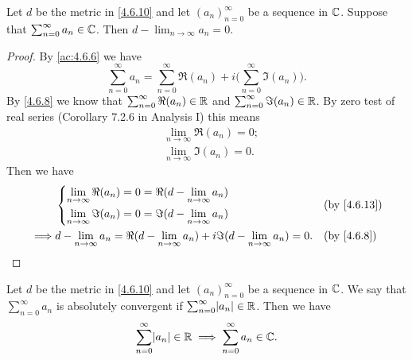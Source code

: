 \begin{ac}\label{ac:4.6.7}
  Let \(d\) be the metric in \cref{4.6.10} and let \((a_n)_{n = 0}^\infty\) be a sequence in \(\mathbb{C}\).
  Suppose that \(\sum_{n = 0}^\infty a_n \in \mathbb{C}\).
  Then \(d - \lim_{n \to \infty} a_n = 0\).
\end{ac}

\begin{proof}
  By \cref{ac:4.6.6} we have
  \[
    \sum_{n = 0}^\infty a_n = \sum_{n = 0}^\infty \Re(a_n) + i \bigg(\sum_{n = 0}^\infty \Im(a_n)\bigg).
  \]
  By \cref{4.6.8} we know that \(\sum_{n = 0}^\infty \Re(a_n) \in \mathbb{R}\) and \(\sum_{n = 0}^\infty \Im(a_n) \in \mathbb{R}\).
  By zero test of real series (Corollary 7.2.6 in Analysis I) this means
  \begin{align*}
     & \lim_{n \to \infty} \Re(a_n) = 0; \\
     & \lim_{n \to \infty} \Im(a_n) = 0.
  \end{align*}
  Then we have
  \begin{align*}
             & \begin{dcases}
                 \lim_{n \to \infty} \Re(a_n) = 0 = \Re(d - \lim_{n \to \infty} a_n) \\
                 \lim_{n \to \infty} \Im(a_n) = 0 = \Im(d - \lim_{n \to \infty} a_n)
               \end{dcases}                                   &  & \text{(by \cref{4.6.13})}                                                          \\
    \implies & d - \lim_{n \to \infty} a_n = \Re(d - \lim_{n \to \infty} a_n) + i \Im(d - \lim_{n \to \infty} a_n) = 0. &  & \text{(by \cref{4.6.8})}
  \end{align*}
\end{proof}

\begin{ac}\label{ac:4.6.8}
  Let \(d\) be the metric in \cref{4.6.10} and let \((a_n)_{n = 0}^\infty\) be a sequence in \(\mathbb{C}\).
  We say that \(\sum_{n = 0}^\infty a_n\) is absolutely convergent if \(\sum_{n = 0}^\infty \abs{a_n} \in \R\).
  Then we have
  \[
    \sum_{n = 0}^\infty \abs{a_n} \in \R \implies \sum_{n = 0}^\infty a_n \in \C.
  \]
\end{ac}


